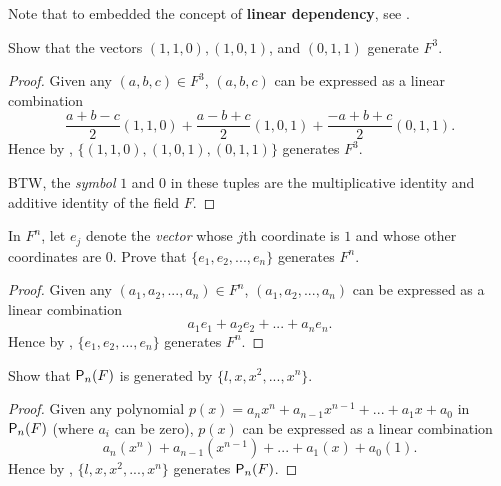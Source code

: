 \begin{note}
Note that  to  embedded the concept of \textbf{linear dependency}, see .
\end{note}

\begin{exercise} \label{exercise 1.4.6}
Show that the vectors \((1, 1, 0), (1, 0, 1)\), and \((0, 1, 1)\) generate \(F^3\).
\end{exercise}

\begin{proof}
Given any \((a, b, c) \in F^3\), \((a, b, c)\) can be expressed as a linear combination
\[
    \frac{a + b - c}{2} (1, 1, 0) + \frac{a - b + c}{2} (1, 0, 1) + \frac{-a + b + c}{2} (0, 1, 1).
\]
Hence by , \(\{(1, 1, 0), (1, 0, 1), (0, 1, 1)\}\) generates \(F^3\).

BTW, the \emph{symbol} \(1\) and \(0\) in these tuples are the multiplicative identity and additive identity of the field \(F\).
\end{proof}

\begin{exercise} \label{exercise 1.4.7}
In \(F^n\), let \(e_j\) denote the \emph{vector} whose \(j\)th coordinate is \(1\) and whose other coordinates are \(0\).
Prove that \(\{ e_1, e_2, ..., e_n \}\) generates \(F^n\).
\end{exercise}

\begin{proof}
Given any \((a_1, a_2, ..., a_n) \in F^n\), \((a_1, a_2, ..., a_n)\) can be expressed as a linear combination
\[
    a_1 e_1 + a_2 e_2 + ... + a_n e_n.
\]
Hence by , \(\{ e_1, e_2, ..., e_n \}\) generates \(F^n\).
\end{proof}

\begin{exercise} \label{exercise 1.4.8}
Show that \(\textsf{P}_n(F)\) is generated by \(\{ l, x, x^2, ..., x^n\}\).
\end{exercise}

\begin{proof}
Given any polynomial \(p(x) = a_n x^n + a_{n - 1} x^{n - 1} + ... + a_1 x + a_0\) in \(\textsf{P}_n(F)\) (where \(a_i\) can be zero), \(p(x)\) can be expressed as a linear combination
\[
    a_n (x^n) + a_{n - 1} (x^{n - 1}) + ... + a_1 (x) + a_0 (1).
\]
Hence by , \(\{ l, x, x^2, ..., x^n\}\) generates \(\textsf{P}_n(F)\).
\end{proof}

